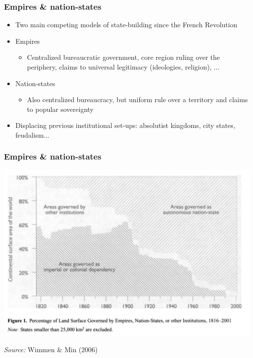 \documentclass[utf8, xcolor=dvipsnames]{beamer}
\begin{document}
\begin{frame}
\frametitle{Empires \& nation-states}
\centering

\begin{itemize}[<+->]
  \item Two main competing models of state-building since the French Revolution
  \item Empires
  \begin{itemize}
    \item Centralized bureaucratic government, core region ruling over the periphery, claims to universal legitimacy (ideologies, religion), ...
  \end{itemize}
  \item Nation-states
  \begin{itemize}
    \item Also centralized bureaucracy, but uniform rule over a territory and claims to popular sovereignty
  \end{itemize}
  \item Displacing previous institutional set-ups: absolutist kingdoms, city states, feudalism...
\end{itemize}

\end{frame}

\begin{frame}
\frametitle{Empires \& nation-states}
\centering

\includegraphics[width = \textwidth]{img/wimmer_min_fig1}

{\scriptsize \textit{Source:} Wimmen \& Min (2006)}

\end{frame}
\end{document}
